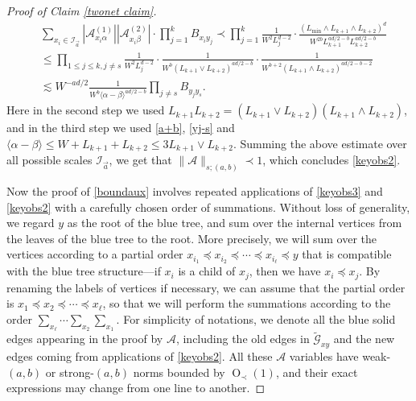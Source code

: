 \documentclass{article}
\newcommand{\1}{\mathds{1}}
\numberwithin{equation}{section}
\newcommand{\al}{\alpha}
\renewcommand{\cal}{\mathcal}
\newcommand{\wt}{\widetilde}
\renewcommand{\leq}{\leqslant}
\renewcommand{\le}{\leq}
\DeclareMathOperator{\OO}{O}
\theoremstyle{plain} %
\theoremstyle{remark}
\begin{document}
\begin{proof}[Proof of Claim \ref{twonet claim}]
\begin{align} \nonumber
& \sum_{x_i \in \cal I_{\vec a}} |\cal A^{(1)}_{x_i \al}|  |\cal A^{(2)} _{x_i \beta}|\cdot \prod_{j=1}^k B_{x_i y_j }    \prec \prod_{j=1}^k\frac{1}{W^2L_j^{d-2}} \cdot\frac{(L_{\min}\wedge L_{k+1}\wedge L_{k+2})^d}{W^{2b} L_{k+1}^{ad/2-b}L_{k+2}^{ad/2-b}} \\
&\le   \prod_{1\le j \le k, j\ne s}\frac{1}{W^2L_j^{d-2}} \cdot\frac{1}{W^{b} (L_{k+1}\vee L_{k+2})^{ad/2-b}}\cdot\frac{1}{W^{b+2}(L_{k+1}\wedge L_{k+2})^{ad/2-b-2}} \nonumber\\
& \lesssim W^{-ad/2} \frac{1}{W^{b} \langle \al-\beta \rangle^{ad/2-b}}\prod_{j\ne s} B_{y_j y_s}. \nonumber
\end{align}  
Here in the second step we used $L_{k+1} L_{k+2}=(L_{k+1}\vee L_{k+2})(L_{k+1}\wedge L_{k+2})$, and  in the third step we used \eqref{a+b}, \eqref{yj-s} and  $\langle \al - \beta \rangle \le W+ L_{k+1} + L_{k+2} \le 3L_{k+1}\vee L_{k+2} $. Summing the above estimate over all possible scales $\cal I_{\vec a}$, we get that $\|\cal A\|_{s;(a,b)}\prec 1$, which concludes \eqref{keyobs2}.




Now the proof of \eqref{boundaux} involves repeated applications of \eqref{keyobs3} and \eqref{keyobs2} with a carefully chosen order of summations. Without loss of generality, we regard $y$ as the root of the blue tree, and sum over the internal vertices from the leaves of the blue tree to the root. More precisely, we will sum over the vertices according to a partial order $x_{i_1}\preceq x_{i_2} \preceq \cdots \preceq x_{i_\ell}\preceq y$ that is compatible with the blue tree structure---if $x_i$ is a child of $x_j$, then we have $x_i \preceq x_j$. %
By renaming the labels of vertices if necessary, we can assume that the partial order is $x_1\preceq x_2  \preceq\cdots \preceq x_\ell$, so that we will perform the summations according to the order $\sum_{x_\ell}\cdots \sum_{x_2}\sum_{x_1}$. For simplicity of notations, we denote all the blue solid edges appearing in the proof by $\cal A$, including the old edges in  $\wt{\cal G}_{xy}$ and the new edges coming from applications of \eqref{keyobs2}. All these $\cal A$ variables have weak-$(a,b)$ or strong-$(a,b)$ norms bounded by $\OO_\prec(1)$, and their exact expressions may change from one line to another. 



\end{proof}
\end{document}

